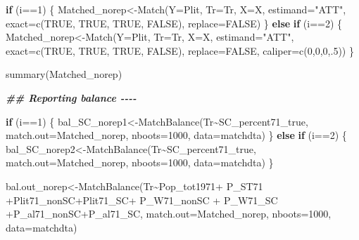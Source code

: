 \documentclass[
]{article}
\newenvironment{Shaded}{\begin{snugshade}}{\end{snugshade}}
\newcommand{\AttributeTok}[1]{\textcolor[rgb]{0.77,0.63,0.00}{#1}}
\newcommand{\ConstantTok}[1]{\textcolor[rgb]{0.00,0.00,0.00}{#1}}
\newcommand{\ControlFlowTok}[1]{\textcolor[rgb]{0.13,0.29,0.53}{\textbf{#1}}}
\newcommand{\DecValTok}[1]{\textcolor[rgb]{0.00,0.00,0.81}{#1}}
\newcommand{\DocumentationTok}[1]{\textcolor[rgb]{0.56,0.35,0.01}{\textbf{\textit{#1}}}}
\newcommand{\FunctionTok}[1]{\textcolor[rgb]{0.00,0.00,0.00}{#1}}
\newcommand{\NormalTok}[1]{#1}
\newcommand{\OtherTok}[1]{\textcolor[rgb]{0.56,0.35,0.01}{#1}}
\newcommand{\SpecialCharTok}[1]{\textcolor[rgb]{0.00,0.00,0.00}{#1}}
\newcommand{\StringTok}[1]{\textcolor[rgb]{0.31,0.60,0.02}{#1}}
\begin{document}
\begin{Shaded}
\begin{Highlighting}[]
\ControlFlowTok{if}\NormalTok{ (i}\SpecialCharTok{==}\DecValTok{1}\NormalTok{) \{}
\NormalTok{Matched\_norep}\OtherTok{\textless{}{-}}\FunctionTok{Match}\NormalTok{(}\AttributeTok{Y=}\NormalTok{Plit, }\AttributeTok{Tr=}\NormalTok{Tr, }\AttributeTok{X=}\NormalTok{X, }\AttributeTok{estimand=}\StringTok{"ATT"}\NormalTok{, }\AttributeTok{exact=}\FunctionTok{c}\NormalTok{(}\ConstantTok{TRUE}\NormalTok{, }\ConstantTok{TRUE}\NormalTok{, }\ConstantTok{TRUE}\NormalTok{, }\ConstantTok{FALSE}\NormalTok{), }\AttributeTok{replace=}\ConstantTok{FALSE}\NormalTok{)}
\NormalTok{\} }\ControlFlowTok{else} \ControlFlowTok{if}\NormalTok{ (i}\SpecialCharTok{==}\DecValTok{2}\NormalTok{) \{}
\NormalTok{Matched\_norep}\OtherTok{\textless{}{-}}\FunctionTok{Match}\NormalTok{(}\AttributeTok{Y=}\NormalTok{Plit, }\AttributeTok{Tr=}\NormalTok{Tr, }\AttributeTok{X=}\NormalTok{X, }\AttributeTok{estimand=}\StringTok{"ATT"}\NormalTok{, }\AttributeTok{exact=}\FunctionTok{c}\NormalTok{(}\ConstantTok{TRUE}\NormalTok{, }\ConstantTok{TRUE}\NormalTok{, }\ConstantTok{TRUE}\NormalTok{, }\ConstantTok{FALSE}\NormalTok{), }\AttributeTok{replace=}\ConstantTok{FALSE}\NormalTok{, }\AttributeTok{caliper=}\FunctionTok{c}\NormalTok{(}\DecValTok{0}\NormalTok{,}\DecValTok{0}\NormalTok{,}\DecValTok{0}\NormalTok{,.}\DecValTok{5}\NormalTok{))}
\NormalTok{\}}

\FunctionTok{summary}\NormalTok{(Matched\_norep)}

\DocumentationTok{\#\# Reporting balance {-}{-}{-}{-}}

\ControlFlowTok{if}\NormalTok{ (i}\SpecialCharTok{==}\DecValTok{1}\NormalTok{) \{}
\NormalTok{bal\_SC\_norep1}\OtherTok{\textless{}{-}}\FunctionTok{MatchBalance}\NormalTok{(Tr}\SpecialCharTok{\textasciitilde{}}\NormalTok{SC\_percent71\_true, }\AttributeTok{match.out=}\NormalTok{Matched\_norep, }\AttributeTok{nboots=}\DecValTok{1000}\NormalTok{, }\AttributeTok{data=}\NormalTok{matchdta)}
\NormalTok{\} }\ControlFlowTok{else} \ControlFlowTok{if}\NormalTok{ (i}\SpecialCharTok{==}\DecValTok{2}\NormalTok{) \{}
\NormalTok{bal\_SC\_norep2}\OtherTok{\textless{}{-}}\FunctionTok{MatchBalance}\NormalTok{(Tr}\SpecialCharTok{\textasciitilde{}}\NormalTok{SC\_percent71\_true, }\AttributeTok{match.out=}\NormalTok{Matched\_norep, }\AttributeTok{nboots=}\DecValTok{1000}\NormalTok{, }\AttributeTok{data=}\NormalTok{matchdta)}
\NormalTok{\}   }

\NormalTok{bal.out\_norep}\OtherTok{\textless{}{-}}\FunctionTok{MatchBalance}\NormalTok{(Tr}\SpecialCharTok{\textasciitilde{}}\NormalTok{Pop\_tot1971}\SpecialCharTok{+}\NormalTok{ P\_ST71 }\SpecialCharTok{+}\NormalTok{Plit71\_nonSC}\SpecialCharTok{+}\NormalTok{Plit71\_SC}\SpecialCharTok{+}\NormalTok{ P\_W71\_nonSC }\SpecialCharTok{+}\NormalTok{ P\_W71\_SC }\SpecialCharTok{+}\NormalTok{P\_al71\_nonSC}\SpecialCharTok{+}\NormalTok{P\_al71\_SC, }\AttributeTok{match.out=}\NormalTok{Matched\_norep, }\AttributeTok{nboots=}\DecValTok{1000}\NormalTok{, }\AttributeTok{data=}\NormalTok{matchdta)}


\end{Highlighting}
\end{Shaded}
\end{document}
